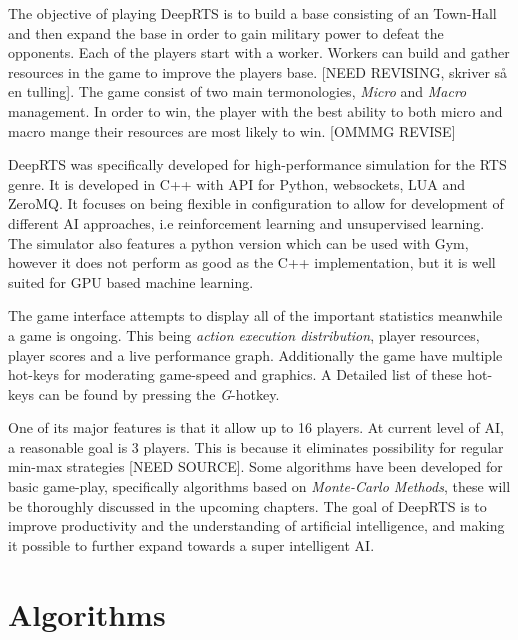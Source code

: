 \documentclass[fleqn,10pt]{SelfArx} %
\begin{document}
The objective of playing DeepRTS is to build a base consisting of an Town-Hall and then expand the base in order to gain military power to defeat the opponents. Each of the players start with a worker. Workers can build and gather resources in the game to improve the players base.   [NEED REVISING, skriver så en tulling]. The game consist of two main termonologies, \textit{Micro} and \textit{Macro} management. In order to win, the player with the best ability to both micro and macro mange their resources are most likely to win. [OMMMG REVISE]

DeepRTS was specifically developed for high-performance simulation for the RTS genre. It is developed in C++ with API for Python, websockets, LUA and ZeroMQ. It focuses on being flexible in configuration to allow for development of different AI approaches, i.e reinforcement learning and unsupervised learning. The simulator also features a python version which can be used with Gym, however it does not perform as good as the C++ implementation, but it is well suited for GPU based machine learning.

The game interface attempts to display all of the important statistics meanwhile a game is ongoing. This being \textit{action execution distribution}, player resources, player scores and a live performance graph.
Additionally the game have multiple hot-keys for moderating game-speed and graphics. A Detailed list of these hot-keys can be found by pressing the \textit{G}-hotkey. 

One of its major features is that it allow up to 16 players. At current level of AI, a reasonable goal is 3 players. This is because it eliminates possibility for regular min-max strategies [NEED SOURCE]. Some algorithms have been developed for basic game-play, specifically algorithms based on \textit{Monte-Carlo Methods}, these will be thoroughly discussed in the upcoming chapters.
The goal of DeepRTS is to improve productivity and the understanding of artificial intelligence, and making it possible to further expand towards a super intelligent AI.


\section{Algorithms}
\end{document}
